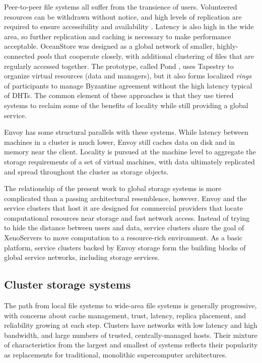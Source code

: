 Peer-to-peer file systems all suffer from the transience of users. Volunteered resources can be withdrawn without notice, and high levels of replication are required to ensure accessibility and availability \cite{blake,rabin89}. Latency is also high in the wide area, so further replication and caching is necessary to make performance acceptable. OceanStore \cite{kubiatowicz} was designed as a global network of smaller, highly-connected \emph{pools} that cooperate closely, with additional clustering of files that are regularly accessed together. The prototype, called Pond \cite{rhea}, uses Tapestry to organize virtual resources (data and managers), but it also forms localized \emph{rings} of participants to manage Byzantine agreement without the high latency typical of DHTs. The common element of these approaches is that they use tiered systems to reclaim some of the benefits of locality while still providing a global service.

Envoy has some structural parallels with these systems. While latency between machines in a cluster is much lower, Envoy still caches data on disk and in memory near the client. Locality is pursued at the machine level to aggregate the storage requirements of a set of virtual machines, with data ultimately replicated and spread throughout the cluster as storage objects.

The relationship of the present work to global storage systems is more complicated than a passing architectural resemblence, however. Envoy and the service clusters that host it are designed for commercial providers that locate computational resources near storage and fast network access. Instead of trying to hide the distance between users and data, service clusters share the goal of XenoServers \cite{reed} to move computation to a resource-rich environment. As a basic platform, service clusters backed by Envoy storage form the building blocks of global service networks, including storage services.

\subsection{Cluster storage systems}

The path from local file systems to wide-area file systems is generally progressive, with concerns about cache management, trust, latency, replica placement, and reliability growing at each step. Clusters have networks with low latency and high bandwidth, and large numbers of trusted, centrally-managed hosts. Their mixture of characteristics from the largest and smallest of systems reflects their popularity as replacements for traditional, monolithic supercomputer architectures.

